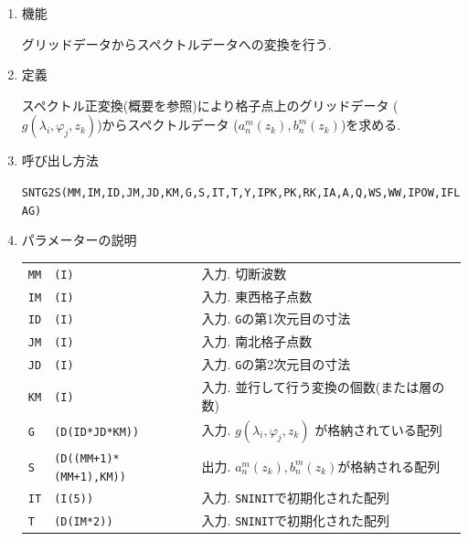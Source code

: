 \documentclass[a4j,fleqn]{jarticle}
\begin{document}
\begin{enumerate}

\item 機能 

グリッドデータからスペクトルデータへの変換を行う.

\item 定義

スペクトル正変換(概要を参照)により格子点上のグリッドデータ
($g(\lambda_i,\varphi_j,z_k)$)からスペクトルデータ
($a^m_n(z_k),b^m_n(z_k)$)を求める.

\item 呼び出し方法 

{\tt SNTG2S(MM,IM,ID,JM,JD,KM,G,S,IT,T,Y,IPK,PK,RK,IA,A,Q,WS,WW,IPOW,IFLAG)}
  
\item パラメーターの説明

\begin{tabular}{lll}
{\tt MM} & {\tt (I)} & 入力. 切断波数\\
{\tt IM} & {\tt (I)} & 入力. 東西格子点数\\
{\tt ID} & {\tt (I)} & 入力. {\tt G}の第1次元目の寸法\\
{\tt JM} & {\tt (I)} & 入力. 南北格子点数\\
{\tt JD} & {\tt (I)} & 入力. {\tt G}の第2次元目の寸法\\
{\tt KM} & {\tt (I)} & 入力. 並行して行う変換の個数(または層の数)\\
{\tt G} & {\tt (D(ID*JD*KM))} & 入力. $g(\lambda_i,\varphi_j,z_k)$
	が格納されている配列\\
{\tt S} & {\tt (D((MM+1)*(MM+1),KM))} 
& 出力.  $a^m_n(z_k),b^m_n(z_k)$が格納される配列\\
{\tt IT}  & {\tt (I(5))}    & 入力. {\tt SNINIT}で初期化された配列\\
{\tt T}   & {\tt (D(IM*2))} & 入力. {\tt SNINIT}で初期化された配列\\


\end{tabular}
\end{enumerate}
\end{document}
